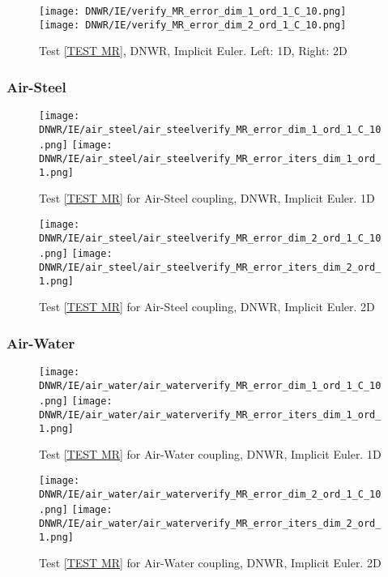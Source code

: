 \documentclass[a4paper,10pt]{article}
\begin{document}
\begin{figure}[!ht]
\texttt{[image: DNWR/IE/verify\_MR\_error\_dim\_1\_ord\_1\_C\_10.png]}
\texttt{[image: DNWR/IE/verify\_MR\_error\_dim\_2\_ord\_1\_C\_10.png]}
\caption{Test \ref{TEST MR}, DNWR, Implicit Euler. Left: 1D, Right: 2D}
\label{FIG DNWR IE MR ERROR}
\end{figure}
% 
\FloatBarrier
\subsubsection{Air-Steel}\label{SEC DNWR IE AIR STEEL}
%

\begin{figure}[!ht]
\texttt{[image: DNWR/IE/air\_steel/air\_steelverify\_MR\_error\_dim\_1\_ord\_1\_C\_10.png]}
\texttt{[image: DNWR/IE/air\_steel/air\_steelverify\_MR\_error\_iters\_dim\_1\_ord\_1.png]}
\caption{Test \ref{TEST MR} for Air-Steel coupling, DNWR, Implicit Euler. 1D}
\label{FIG DNWR IE AIR STEEL 1D}
\end{figure}

\begin{figure}[!ht]
\texttt{[image: DNWR/IE/air\_steel/air\_steelverify\_MR\_error\_dim\_2\_ord\_1\_C\_10.png]}
\texttt{[image: DNWR/IE/air\_steel/air\_steelverify\_MR\_error\_iters\_dim\_2\_ord\_1.png]}
\caption{Test \ref{TEST MR} for Air-Steel coupling, DNWR, Implicit Euler. 2D}
\label{FIG DNWR IE AIR STEEL 2D}
\end{figure}

\FloatBarrier
\subsubsection{Air-Water}\label{SEC DNWR IE AIR WATER}
% 

\begin{figure}[!ht]
\texttt{[image: DNWR/IE/air\_water/air\_waterverify\_MR\_error\_dim\_1\_ord\_1\_C\_10.png]}
\texttt{[image: DNWR/IE/air\_water/air\_waterverify\_MR\_error\_iters\_dim\_1\_ord\_1.png]}
\caption{Test \ref{TEST MR} for Air-Water coupling, DNWR, Implicit Euler. 1D}
\label{FIG DNWR IE AIR WATER 1D}
\end{figure}

\begin{figure}[!ht]
\texttt{[image: DNWR/IE/air\_water/air\_waterverify\_MR\_error\_dim\_2\_ord\_1\_C\_10.png]}
\texttt{[image: DNWR/IE/air\_water/air\_waterverify\_MR\_error\_iters\_dim\_2\_ord\_1.png]}
\caption{Test \ref{TEST MR} for Air-Water coupling, DNWR, Implicit Euler. 2D}
\label{FIG DNWR IE AIR WATER 2D}
\end{figure}
\end{document}
